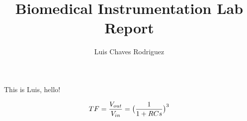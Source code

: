 \documentclass{article}
\title{Biomedical Instrumentation Lab Report}
\author{Luis Chaves Rodriguez}
\begin{document}
\maketitle 

This is Luis, hello!


$$TF = {V_{out}\over V_{in}} = {\big({1 \over {1+RCs}}\big)^3}$$
\end{document}
